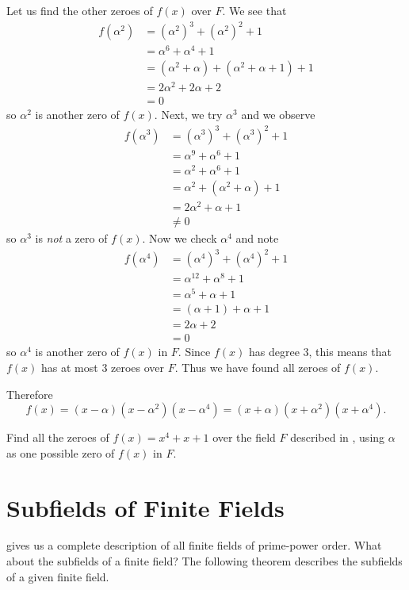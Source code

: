 \begin{example}
    Let us find the other zeroes of $f(x)$ over $F$. We see that
    \begin{align*}
        f(\alpha^2) &= (\alpha^2)^3 + (\alpha^2)^2 + 1\\
        &= \alpha^6 + \alpha^4 + 1\\
        &= (\alpha^2 + \alpha) + (\alpha^2 + \alpha + 1) + 1\\
        &= 2\alpha^2 + 2\alpha + 2\\
        &= 0
    \end{align*}
    so $\alpha^2$ is another zero of $f(x)$. Next, we try $\alpha^3$ and we observe
    \begin{align*}
        f(\alpha^3) &= (\alpha^3)^3 + (\alpha^3)^2 + 1\\
        &= \alpha^9 + \alpha^6 + 1\\
        &= \alpha^2 + \alpha^6 + 1\\
        &= \alpha^2 + (\alpha^2 + \alpha) + 1\\
        &= 2\alpha^2 + \alpha + 1\\
        &\neq 0
    \end{align*}
    so $\alpha^3$ is \textit{not} a zero of $f(x)$. Now we check $\alpha^4$ and note
    \begin{align*}
        f(\alpha^4) &= (\alpha^4)^3 + (\alpha^4)^2 + 1\\
        &= \alpha^{12} + \alpha^8 + 1\\
        &= \alpha^5 + \alpha + 1\\
        &= (\alpha + 1) + \alpha + 1\\
        &= 2\alpha + 2\\
        &= 0
    \end{align*}
    so $\alpha^4$ is another zero of $f(x)$ in $F$. Since $f(x)$ has degree 3, this means that $f(x)$ has at most 3 zeroes over $F$. Thus we have found all zeroes of $f(x)$.

    Therefore
    \[
        f(x) = (x - \alpha)(x - \alpha^2)(x - \alpha^4) = (x + \alpha)(x + \alpha^2)(x + \alpha^4).
    \]
\end{example}

\begin{exercise}
    Find all the zeroes of $f(x) = x^4 + x + 1$ over the field $F$ described in , using $\alpha$ as one possible zero of $f(x)$ in $F$.
\end{exercise}

\section{Subfields of Finite Fields}
 gives us a complete description of all finite fields of prime-power order. What about the subfields of a finite field? The following theorem describes the subfields of a given finite field.

